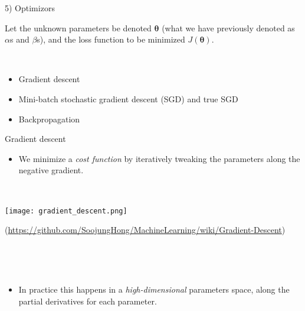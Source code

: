 \documentclass[
  10pt,
  ignorenonframetext,
]{beamer}
\providecommand{\tightlist}{%
  \setlength{\itemsep}{0pt}\setlength{\parskip}{0pt}}
\begin{document}
\begin{frame}
\begin{block}{5) Optimizors}
\protect\hypertarget{optimizors}{}
\(~\)

Let the unknown parameters be denoted \({\boldsymbol \theta}\) (what we
have previously denoted as \(\alpha\)s and \(\beta\)s), and the loss
function to be minimized \(J({\boldsymbol \theta})\).

\(~\)

\begin{itemize}
\item
  Gradient descent
\item
  Mini-batch stochastic gradient descent (SGD) and true SGD
\item
  Backpropagation
\end{itemize}
\end{block}
\end{frame}

\begin{frame}
\begin{block}{Gradient descent}
\protect\hypertarget{gradient-descent}{}
\(~\)

\begin{itemize}
\tightlist
\item
  We minimize a \emph{cost function} by iteratively tweaking the
  parameters along the negative gradient.
\end{itemize}

\(~\)

\center

\texttt{[image: gradient\_descent.png]}

\tiny (\url{https://github.com/SoojungHong/MachineLearning/wiki/Gradient-Descent})

\(~\)

\(~\)

\normalsize
\flushleft

\begin{itemize}
\tightlist
\item
  In practice this happens in a \emph{high-dimensional} parameters
  space, along the partial derivatives for each parameter.
\end{itemize}
\end{block}
\end{frame}
\end{document}
